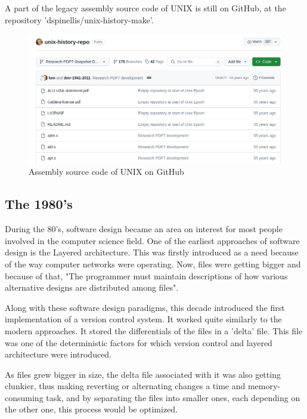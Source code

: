 A part of the legacy assembly source code of UNIX is still on GitHub, at the repository 'dspinellis/unix-history-make'.
\begin{figure}[htbp]
    \centering
    \includegraphics[scale=0.5]{pictures/unix_repo.png}
    \caption{Assembly source code of UNIX on GitHub}
    \label{unixRepo}
\end{figure}

\subsection{The 1980's}
During the 80's, software design became an area on interest for most people involved in the computer science field.
One of the earliest approaches of software design is the Layered architecture.
This was firstly introduced as a need because of the way computer networks were operating.
Now, files were getting bigger and because of that, "The programmer must maintain descriptions of
how various alternative designs are distributed among files"\cite{layeredArchitecure80s}.

\par

Along with these software design paradigms, this decade introduced the first implementation of a version control system.
It worked quite similarly to the modern approaches.
It stored the differentials of the files in a 'delta' file\cite{layeredArchitecure80s}.
This file was one of the deterministic factors for which version control and layered architecture were introduced.

As files grew bigger in size, the delta file associated with it was also getting clunkier, thus making reverting or alternating changes a time and memory-consuming task, and by separating the files into smaller ones, each depending on the other one, this process would be optimized.

